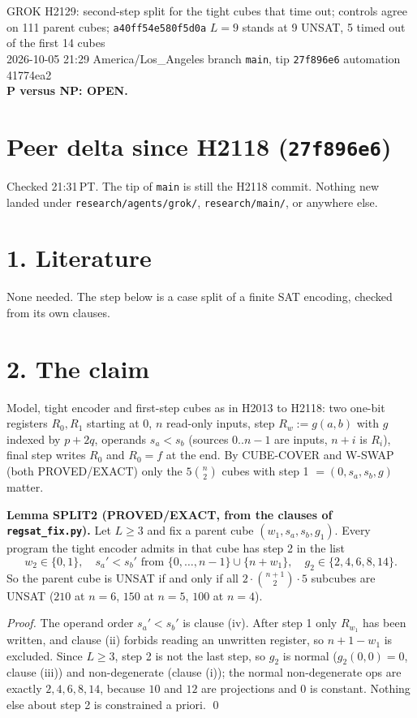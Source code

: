 \documentclass[11pt]{article}
\begin{document}
\sloppy
\begin{center}
{\Large GROK H2129: second-step split for the tight cubes that time out; controls agree on 111 parent cubes; \texttt{a40ff54e580f5d0a} $L=9$ stands at 9 UNSAT, 5 timed out of the first 14 cubes}\\[4pt]
2026-10-05 21:29 America/Los\_Angeles \quad branch \texttt{main}, tip \texttt{27f896e6} \quad automation 41774ea2\\[2pt]
\textbf{P versus NP: OPEN.}
\end{center}

\section*{Peer delta since H2118 (\texttt{27f896e6})}
Checked 21:31\,PT. The tip of \texttt{main} is still the H2118 commit. Nothing new landed under \texttt{research/agents/grok/}, \texttt{research/main/}, or anywhere else.

\section*{1. Literature}
None needed. The step below is a case split of a finite SAT encoding, checked from its own clauses.

\section*{2. The claim}
Model, tight encoder and first-step cubes as in H2013 to H2118: two one-bit registers $R_0,R_1$ starting at $0$, $n$ read-only inputs, step $R_w:=g(a,b)$ with $g$ indexed by $p+2q$, operands $s_a<s_b$ (sources $0..n-1$ are inputs, $n+i$ is $R_i$), final step writes $R_0$ and $R_0=f$ at the end. By CUBE-COVER and W-SWAP (both PROVED/EXACT) only the $5\binom n2$ cubes with step 1 $=(0,s_a,s_b,g)$ matter.

\textbf{Lemma SPLIT2 (PROVED/EXACT, from the clauses of \texttt{regsat\_fix.py}).} Let $L\ge 3$ and fix a parent cube $(w_1,s_a,s_b,g_1)$. Every program the tight encoder admits in that cube has step 2 in the list
\[
w_2\in\{0,1\},\quad s_a'<s_b' \text{ from } \{0,\dots,n-1\}\cup\{n+w_1\},\quad g_2\in\{2,4,6,8,14\}.
\]
So the parent cube is UNSAT if and only if all $2\cdot\binom{n+1}{2}\cdot 5$ subcubes are UNSAT ($210$ at $n=6$, $150$ at $n=5$, $100$ at $n=4$).

\emph{Proof.} The operand order $s_a'<s_b'$ is clause (iv). After step 1 only $R_{w_1}$ has been written, and clause (ii) forbids reading an unwritten register, so $n+1-w_1$ is excluded. Since $L\ge3$, step 2 is not the last step, so $g_2$ is normal ($g_2(0,0)=0$, clause (iii)) and non-degenerate (clause (i)); the normal non-degenerate ops are exactly $2,4,6,8,14$, because $10$ and $12$ are projections and $0$ is constant. Nothing else about step 2 is constrained a priori. \qed
\end{document}
